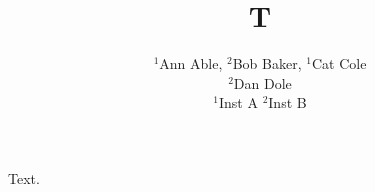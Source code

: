 \documentclass{article}
\begin{document}
\title{T}
\author{\parbox{\textwidth}{\centering $^1$Ann Able, $^2$Bob Baker, $^1$Cat Cole\\ $^2$Dan Dole\\
$^1$Inst A \quad $^2$Inst B}}
\maketitle
Text.
\end{document}

